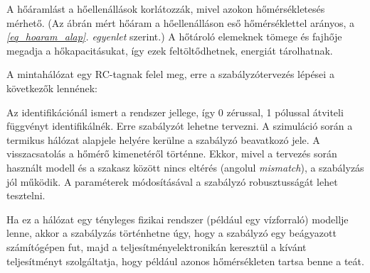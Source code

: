 A hőáramlást a hőellenállások korlátozzák, mivel azokon hőmérsékletesés mérhető. (Az ábrán mért hőáram a hőellenálláson eső hőmérséklettel arányos, a \textit{\ref{eq_hoaram_alap}. egyenlet} szerint.) A hőtároló elemeknek tömege és fajhője megadja a hőkapacitásukat, így ezek feltöltődhetnek, energiát tárolhatnak.


A mintahálózat egy RC-tagnak felel meg, erre a szabályzótervezés lépései a következők lennének:%

Az identifikációnál ismert a rendszer jellege, így 0 zérussal, 1 pólussal átviteli függvényt identifikálnék.
Erre szabályzót lehetne tervezni. A szimuláció során a termikus hálózat alapjele helyére kerülne a szabályzó beavatkozó jele. A visszacsatolás a hőmérő kimenetéről történne. Ekkor, mivel a tervezés során használt modell és a  szakasz között nincs eltérés (angolul \textit{mismatch}), a szabályzás jól működik.
A paraméterek módosításával a szabályzó robusztusságát lehet tesztelni.

Ha ez a hálózat egy tényleges fizikai rendszer (például egy vízforraló) modellje lenne, akkor a szabályzás történhetne úgy, hogy a szabályzó egy beágyazott számítógépen fut, majd a teljesítményelektronikán keresztül a kívánt teljesítményt szolgáltatja, hogy például azonos hőmérsékleten tartsa benne a teát.


